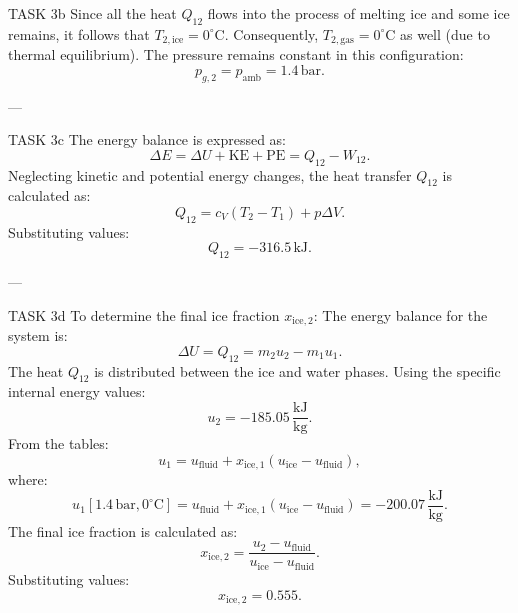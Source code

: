 TASK 3b  
Since all the heat \( Q_{12} \) flows into the process of melting ice and some ice remains, it follows that \( T_{2,\text{ice}} = 0^\circ\text{C} \). Consequently, \( T_{2,\text{gas}} = 0^\circ\text{C} \) as well (due to thermal equilibrium). The pressure remains constant in this configuration:  
\[
p_{g,2} = p_{\text{amb}} = 1.4 \, \text{bar}.
\]

---

TASK 3c  
The energy balance is expressed as:  
\[
\Delta E = \Delta U + \text{KE} + \text{PE} = Q_{12} - W_{12}.
\]  
Neglecting kinetic and potential energy changes, the heat transfer \( Q_{12} \) is calculated as:  
\[
Q_{12} = c_V (T_2 - T_1) + p \Delta V.
\]  
Substituting values:  
\[
Q_{12} = -316.5 \, \text{kJ}.
\]

---

TASK 3d  
To determine the final ice fraction \( x_{\text{ice},2} \):  
The energy balance for the system is:  
\[
\Delta U = Q_{12} = m_2 u_2 - m_1 u_1.
\]  
The heat \( Q_{12} \) is distributed between the ice and water phases. Using the specific internal energy values:  
\[
u_2 = -185.05 \, \frac{\text{kJ}}{\text{kg}}.
\]  
From the tables:  
\[
u_1 = u_{\text{fluid}} + x_{\text{ice},1} (u_{\text{ice}} - u_{\text{fluid}}),
\]  
where:  
\[
u_1[1.4 \, \text{bar}, 0^\circ\text{C}] = u_{\text{fluid}} + x_{\text{ice},1} (u_{\text{ice}} - u_{\text{fluid}}) = -200.07 \, \frac{\text{kJ}}{\text{kg}}.
\]  
The final ice fraction is calculated as:  
\[
x_{\text{ice},2} = \frac{u_2 - u_{\text{fluid}}}{u_{\text{ice}} - u_{\text{fluid}}}.
\]  
Substituting values:  
\[
x_{\text{ice},2} = 0.555.
\]
